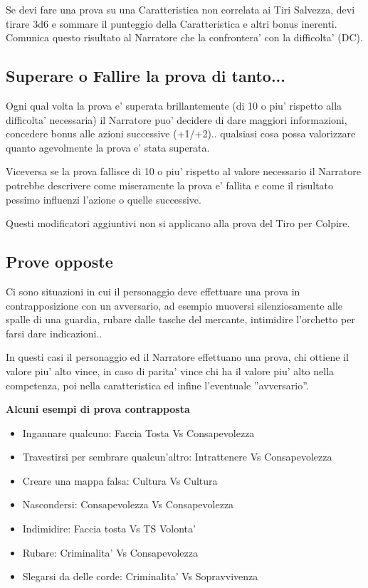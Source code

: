 \documentclass[a4paper,11pt,twoside,openany]{book}
\begin{document}
\bigskip

Se devi fare una prova su una Caratteristica non correlata ai Tiri Salvezza, devi tirare 3d6 e sommare il punteggio della Caratteristica e altri bonus inerenti. Comunica questo risultato al Narratore che la confrontera' con la difficolta' (DC).

\subsection{Superare o Fallire la prova di tanto...}

Ogni qual volta la prova e' superata brillantemente (di 10 o piu' rispetto alla difficolta' necessaria) il Narratore puo' decidere di dare maggiori informazioni, concedere bonus alle azioni successive (+1/+2).. qualsiasi cosa possa valorizzare quanto agevolmente la prova e' stata superata.

Viceversa se la prova fallisce di 10 o piu' rispetto al valore necessario il Narratore potrebbe descrivere come miseramente la prova e' fallita e come il risultato pessimo influenzi l'azione o quelle successive.

Questi modificatori aggiuntivi non si applicano alla prova del Tiro per Colpire.

\subsection{Prove opposte}

Ci sono situazioni in cui il personaggio deve effettuare una prova in contrapposizione con un avversario, ad esempio muoversi silenziosamente alle spalle di una guardia, rubare dalle tasche del mercante, intimidire l'orchetto per farsi dare indicazioni..

In questi casi il personaggio ed il Narratore effettuano una prova, chi ottiene il valore piu' alto vince, in caso di parita' vince chi ha il valore piu' alto nella competenza, poi nella caratteristica ed infine l'eventuale ''avversario''.

\bigskip

\textbf{Alcuni esempi di prova contrapposta}

\begin{itemize}
\item Ingannare qualcuno: Faccia Tosta Vs Consapevolezza
\item Travestirsi per sembrare qualcun'altro: Intrattenere Vs Consapevolezza
\item Creare una mappa falsa: Cultura Vs Cultura
\item Nascondersi: Consapevolezza Vs Consapevolezza
\item Indimidire: Faccia tosta Vs TS Volonta'
\item Rubare: Criminalita' Vs Consapevolezza
\item Slegarsi da delle corde: Criminalita' Vs Sopravvivenza
\end{itemize}
\end{document}
